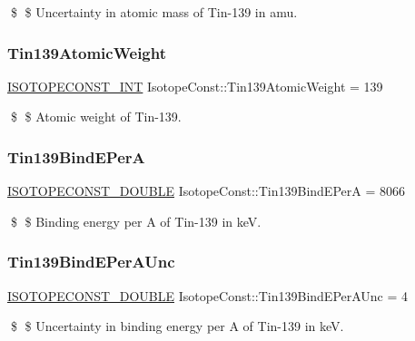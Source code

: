 \$ \$ Uncertainty in atomic mass of Tin-\/139 in amu. \mbox{\label{group___isotope_const-_tin-_sn139_ga91357764030a6b008e5638433baf48c2}} 
\subsubsection{\texorpdfstring{Tin139\+Atomic\+Weight}{Tin139AtomicWeight}}
{\footnotesize\ttfamily \mbox{\hyperlink{group___isotope_const-_macros_ga5f18360b3e99483a35c32d789e62621c}{I\+S\+O\+T\+O\+P\+E\+C\+O\+N\+S\+T\+\_\+\+I\+NT}} Isotope\+Const\+::\+Tin139\+Atomic\+Weight = 139}

\$ \$ Atomic weight of Tin-\/139. \mbox{\label{group___isotope_const-_tin-_sn139_gaf1962e29465c41f6bb6b9d4ecc6b7aeb}} 
\subsubsection{\texorpdfstring{Tin139\+Bind\+E\+PerA}{Tin139BindEPerA}}
{\footnotesize\ttfamily \mbox{\hyperlink{group___isotope_const-_macros_ga8f45a7272ce02c0b4c65c44636ed719a}{I\+S\+O\+T\+O\+P\+E\+C\+O\+N\+S\+T\+\_\+\+D\+O\+U\+B\+LE}} Isotope\+Const\+::\+Tin139\+Bind\+E\+PerA = 8066}

\$ \$ Binding energy per A of Tin-\/139 in keV. \mbox{\label{group___isotope_const-_tin-_sn139_gacab7409b7090f810e69448f805a66443}} 
\subsubsection{\texorpdfstring{Tin139\+Bind\+E\+Per\+A\+Unc}{Tin139BindEPerAUnc}}
{\footnotesize\ttfamily \mbox{\hyperlink{group___isotope_const-_macros_ga8f45a7272ce02c0b4c65c44636ed719a}{I\+S\+O\+T\+O\+P\+E\+C\+O\+N\+S\+T\+\_\+\+D\+O\+U\+B\+LE}} Isotope\+Const\+::\+Tin139\+Bind\+E\+Per\+A\+Unc = 4}

\$ \$ Uncertainty in binding energy per A of Tin-\/139 in keV. \mbox{\label{group___isotope_const-_tin-_sn139_ga2e4576c4db48120c412981276730fb62}} 
